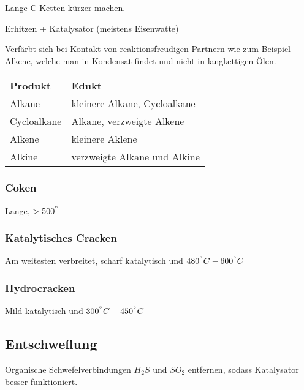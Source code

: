 \begin{definition}[Sinn]
	Lange C-Ketten kürzer machen.
\end{definition}

\begin{definition}[Vorgang]
	Erhitzen + Katalysator (meistens Eisenwatte)
\end{definition}

\begin{definition}
	Verfärbt sich bei Kontakt von reaktionsfreudigen Partnern wie zum Beispiel Alkene, welche man in Kondensat findet und nicht in langkettigen Ölen.
\end{definition}

\begin{center}
	\begin{tabular}{ l  l }
		\textbf{Produkt} & \textbf{Edukt} \\
		Alkane & kleinere Alkane, Cycloalkane \\
		Cycloalkane & Alkane, verzweigte Alkene \\
		Alkene & kleinere Aklene \\
		Alkine & verzweigte Alkane und Alkine
	\end{tabular}
\end{center}

\subsubsection{Coken}

Lange, $> 500^{\degree}$

\subsubsection{Katalytisches Cracken}

Am weitesten verbreitet, scharf katalytisch und $480^{\degree} C -600^{\degree} C$

\subsubsection{Hydrocracken}

Mild katalytisch und $300^{\degree} C -450^{\degree} C$

\subsection{Entschweflung}

\begin{definition}[Ziel]
	Organische Schwefelverbindungen $H_2S$ und $SO_2$ entfernen, sodass Katalysator besser funktioniert.
\end{definition}

